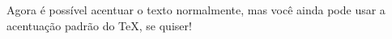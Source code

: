 \documentclass[a4paper,12pt]{article}
\begin{document}
	Agora é possível acentuar o texto normalmente,
	mas você ainda pode usar a acentua\c c\~ao
	padr\~ao do \TeX, se quiser!
\end{document}

